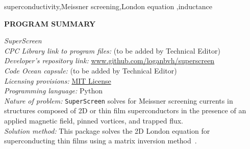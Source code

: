 \documentclass[final,3p,times,twocolumn]{elsarticle}
\newcommand{\inline}[1]{\texttt{#1}\xspace}
\newcommand{\SuperScreen}{\inline{SuperScreen}}
\begin{document}
\begin{frontmatter}
\begin{keyword}
superconductivity\sep Meissner screening\sep London equation \sep inductance

\end{keyword}

\end{frontmatter}


\noindent
{\bf PROGRAM SUMMARY}

\begin{small}
\noindent
{\em SuperScreen}\\
{\em CPC Library link to program files:} (to be added by Technical Editor) \\
{\em Developer's repository link:} \href{http://www.github.com/loganbvh/superscreen}{www.github.com/loganbvh/superscreen}\\
{\em Code Ocean capsule:} (to be added by Technical Editor)\\
{\em Licensing provisions:} \href{https://opensource.org/licenses/MIT}{MIT License}\\
{\em Programming language:} Python\\
{\em Nature of problem:} \SuperScreen solves for Meissner screening currents in structures composed of 2D or thin film superconductors in the presence of an applied magnetic field, pinned vortices, and trapped flux.\\
{\em Solution method:} This package solves the 2D London equation for superconducting thin films using a matrix inversion method~\cite{Brandt2004-ew,Brandt2005-wj}.\\
   \\


\end{small}
\end{document}

